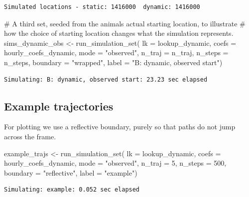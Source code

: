 \documentclass[
  letterpaper,
  DIV=11,
  numbers=noendperiod]{scrartcl}
\newenvironment{Shaded}{\begin{snugshade}}{\end{snugshade}}
\newcommand{\AttributeTok}[1]{\textcolor[rgb]{0.40,0.45,0.13}{#1}}
\newcommand{\CommentTok}[1]{\textcolor[rgb]{0.37,0.37,0.37}{#1}}
\newcommand{\DecValTok}[1]{\textcolor[rgb]{0.68,0.00,0.00}{#1}}
\newcommand{\FunctionTok}[1]{\textcolor[rgb]{0.28,0.35,0.67}{#1}}
\newcommand{\NormalTok}[1]{\textcolor[rgb]{0.00,0.23,0.31}{#1}}
\newcommand{\OtherTok}[1]{\textcolor[rgb]{0.00,0.23,0.31}{#1}}
\newcommand{\StringTok}[1]{\textcolor[rgb]{0.13,0.47,0.30}{#1}}
\begin{document}
\begin{verbatim}
Simulated locations - static: 1416000  dynamic: 1416000 
\end{verbatim}

\begin{Shaded}
\begin{Highlighting}[]
\CommentTok{\# A third set, seeded from the animal\textquotesingle{}s actual starting location, to illustrate}
\CommentTok{\# how the choice of starting location changes what the simulation represents.}
\NormalTok{sims\_dynamic\_obs }\OtherTok{\textless{}{-}} \FunctionTok{run\_simulation\_set}\NormalTok{(}
  \AttributeTok{lk =}\NormalTok{ lookup\_dynamic, }\AttributeTok{coefs =}\NormalTok{ hourly\_coefs\_dynamic, }\AttributeTok{mode =} \StringTok{"observed"}\NormalTok{,}
  \AttributeTok{n\_traj =}\NormalTok{ n\_traj, }\AttributeTok{n\_steps =}\NormalTok{ n\_steps, }\AttributeTok{boundary =} \StringTok{"wrapped"}\NormalTok{,}
  \AttributeTok{label =} \StringTok{"B: dynamic, observed start"}\NormalTok{)}
\end{Highlighting}
\end{Shaded}

\begin{verbatim}
Simulating: B: dynamic, observed start: 23.23 sec elapsed
\end{verbatim}

\subsection{Example trajectories}\label{example-trajectories}

For plotting we use a reflective boundary, purely so that paths do not
jump across the frame.

\begin{Shaded}
\begin{Highlighting}[]
\NormalTok{example\_trajs }\OtherTok{\textless{}{-}} \FunctionTok{run\_simulation\_set}\NormalTok{(}
  \AttributeTok{lk =}\NormalTok{ lookup\_dynamic, }\AttributeTok{coefs =}\NormalTok{ hourly\_coefs\_dynamic, }\AttributeTok{mode =} \StringTok{"observed"}\NormalTok{,}
  \AttributeTok{n\_traj =} \DecValTok{5}\NormalTok{, }\AttributeTok{n\_steps =} \DecValTok{500}\NormalTok{, }\AttributeTok{boundary =} \StringTok{"reflective"}\NormalTok{,}
  \AttributeTok{label =} \StringTok{"example"}\NormalTok{)}
\end{Highlighting}
\end{Shaded}

\begin{verbatim}
Simulating: example: 0.052 sec elapsed
\end{verbatim}
\end{document}
